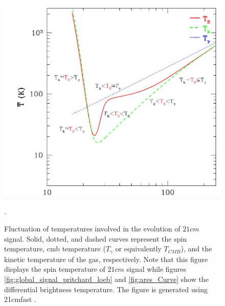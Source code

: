 \documentclass[12pt, TexShade, letterpaper]{report}
\begin{document}
\begin{figure}[h!]
    \centering
    \includegraphics[scale = 0.6]{21cm_curve.jpg}
    \caption[Fluctuation of temperatures involved in the evolution of $21cm$ signal]{Fluctuation of temperatures involved in the evolution of $21cm$ signal. Solid, dotted, and dashed curves represent the spin temperature, \gls{cmb} temperature ($T_\gamma$ or equivalently $T_{CMB}$), and the kinetic temperature of the gas, respectively. Note that this figure displays the spin temperature of $21cm$ signal while figures \ref{fig:global_signal_pritchard_loeb} and \ref{fig:ares_Curve} show the differential brightness temperature. The figure is generated using \gls{21cmfast} \cite{21cmfast_python}.}.
    \label{fig:21cmfast_curve}
\end{figure}
\end{document}
